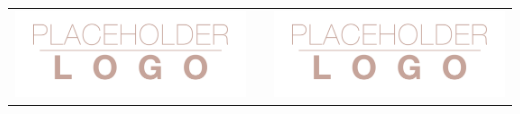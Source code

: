 \documentclass[final]{beamer}
\newlength{\onecolwid}
\begin{document}
\begin{frame}[t]
\begin{columns}[t]
\begin{column}{\onecolwid}
\begin{center}
\begin{tabular}{ccc}
\includegraphics[width=0.4\linewidth]{logo.png} & \hfill & \includegraphics[width=0.4\linewidth]{logo.png}
\end{tabular}
\end{center}


\end{column} %

\end{columns} %

\end{frame} %
\end{document}

